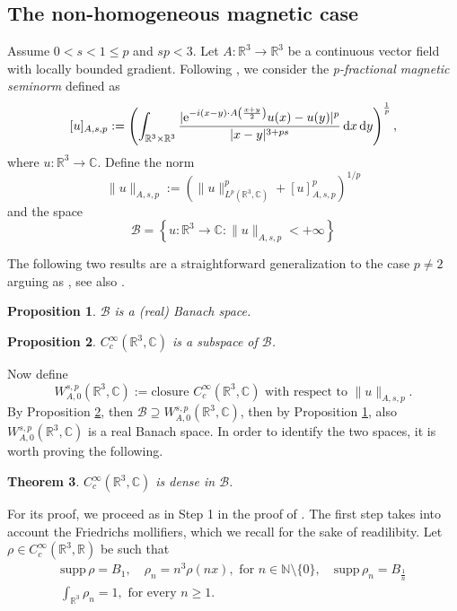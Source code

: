 \documentclass[leqno,11pt]{amsart}
\newcommand{\NN}{\mathbb N}
\newcommand{\R}{\mathbb R}
\newcommand{\CC}{\mathbb C}
\newcommand{\C}{\mathbb C}
\newcommand{\cB}{{\mathcal B}}
\newcommand{\supp}{\mathrm{supp}\,}
\numberwithin{equation}{section}
\newtheorem{theorem}{Theorem}[section]
\newtheorem{proposition}[theorem]{Proposition}
\def\e{{\rm e}}
\newcommand{\expAminus}{\e^{-i(x-y)\cdot A\left(\frac{x+y}{2}\right)}}
\begin{document}
\subsection{The non-homogeneous magnetic case}
Assume $0<s<1\le p$ and $sp<3$. Let $A:\R^3 \to \R^3$ be a continuous vector field with locally bounded gradient.
Following \cite{NguyenPinamontiSquassinaVecchi_2018}, we consider the \textit{p-fractional magnetic seminorm} defined as
\begin{equation}\label{normAsp}
    [u]_{A,s,p}:=\left(\int_{\R^3 \times \R^3}\frac{|\expAminus u(x) - u(y)|^p}{|x-y|^{3+ps}} \dd x \dd y \right)^{\frac1p},
\end{equation}
where $u:\R^3\to\CC$. Define the norm
\begin{equation}
\label{complete:normAsp}
    \|u\|_{A,s,p}:=(\|u\|^p_{L^p(\R^3,\C)}+[u]^p_{A,s,p})^{1/p}
\end{equation}
and the space
$$\cB =\left\{u:  \R^3\to\CC : \|u\|_{A,s,p} < +\infty\right\}$$

The following two results are a straightforward generalization to the case $p\neq 2$ arguing as \cite[Proposition 2.1, Proposition 2.2]{dAveniaSquassina}, see also \cite{BerninidAvenia}.
\begin{proposition}\label{prop1}
$\cB$ is a (real) Banach space.
\end{proposition}


\begin{proposition}\label{prop2}
$C^\infty_c(\R^3,\CC)$ is a subspace of $\cB$.
\end{proposition}


Now define
$$W^{s,p}_{A,0}(\R^3,\CC):=\text{closure $C_c^\infty(\R^3,\CC)$ with respect to $\|u\|_{A,s,p}$}.$$
By Proposition \ref{prop2}, then $\cB\supseteq W^{s,p}_{A,0}(\R^3,\CC)$, then by Proposition \ref{prop1}, also $W^{s,p}_{A,0}(\R^3,\CC)$ is a real Banach space. In order to identify the two spaces, it is worth proving the following.


\begin{theorem}
\label{density:theorem}
$C^\infty_c(\R^3,\CC)$ is dense in $\cB$.    
\end{theorem}

For its proof, we proceed as in Step 1 in the proof of \cite[Theorem 3.1]{BrascoGV}. The first step takes into account  the Friedrichs mollifiers, which we recall for the sake of readilibity. Let $\rho \in C^\infty_c(\R^3,\R)$ be such that
\begin{gather}
    \label{mollifiers:definition}
    \supp \rho = B_1, \quad \rho_n=n^3\rho(nx), \text{ for } n \in \NN\setminus\{0\}, \quad \supp \rho_n = B_{\frac1n}\\
    \label{mollifiers:equal:1}
    \int_{\R^3} \rho_n = 1, \text{ for every } n \geq 1.
\end{gather}
\end{document}
